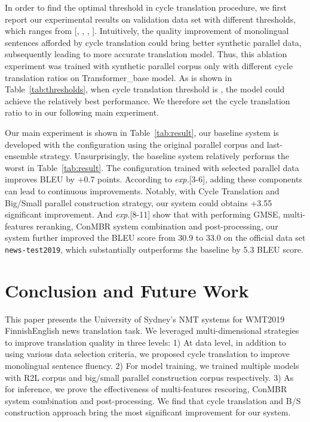\documentclass[11pt,a4paper]{article}
\begin{document}
In order to find the optimal threshold in cycle translation procedure, we first report our experimental results on validation data set with different thresholds, which ranges from [, , , ]. Intuitively, the quality improvement of monolingual sentences afforded by cycle translation could bring better synthetic parallel data, subsequently leading to more accurate translation model. Thus, this ablation experiment was trained with synthetic parallel corpus only with different cycle translation ratios on Transformer\_base model. As is shown in Table~\ref{tab:thresholds}, when cycle translation threshold is , the model could achieve the relatively best performance. We therefore set the cycle translation ratio to  in our following main experiment.


Our main experiment is shown in Table~\ref{tab:result}, our baseline system is developed with the  configuration using the original parallel corpus and last- ensemble strategy. Unsurprisingly, the baseline system relatively performs the worst in Table~\ref{tab:result}. The  configuration trained with selected parallel data improves BLEU by +0.7 points. According to \textit{exp.}[3-6], adding these components can lead to continuous improvements. Notably, with Cycle Translation and Big/Small parallel construction strategy, our system could obtains +3.55 significant improvement. And \textit{exp.}[8-11] show that with performing GMSE, multi-features reranking, ConMBR system combination and post-processing, our system further improved the BLEU score from 30.9 to 33.0 on the official data set \verb|news-test2019|, which substantially outperforms the baseline by 5.3 BLEU score.


\section{Conclusion and Future Work}
\label{sec:con}
This paper presents the University of Sydney's NMT systems for WMT2019 FinnishEnglish news translation task. We leveraged multi-dimensional strategies to improve translation quality in three levels: 1) At data level, in addition to using various data selection criteria, we proposed cycle translation to improve monolingual sentence fluency. 2) For model training, we trained multiple models with R2L corpus and big/small parallel construction corpus respectively. 3) As for inference, we prove the effectiveness of multi-features rescoring, ConMBR system combination and post-processing. We find that cycle translation and B/S construction approach bring the most significant improvement for our system.
\end{document}
